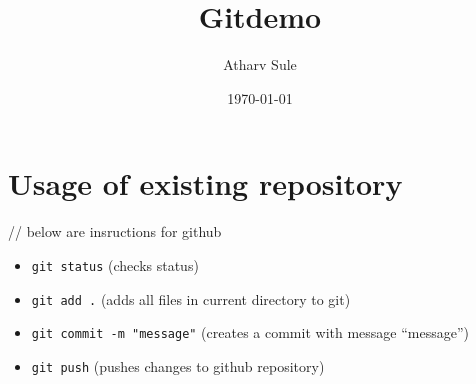 \documentclass[11pt]{article}
\author{Atharv Sule}
\date{\today}
\title{Gitdemo}
\begin{document}
\maketitle
\tableofcontents



\section{Usage of existing repository}
\label{sec:org068c7a6}


// below are insructions for github
\begin{itemize}
\item \texttt{git status}  (checks status)
\item \texttt{git add .} (adds all files in current directory to git)
\item \texttt{git commit -m "message"} (creates a commit with message ``message'')
\item \texttt{git push} (pushes changes to github repository)
\end{itemize}
\end{document}
